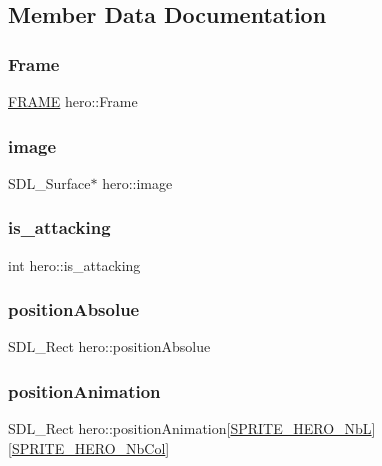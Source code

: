 \subsection{Member Data Documentation}
\mbox{\label{structhero_a5c0232e4390f7b0a64ab38f2fd0aa09b}} 
\subsubsection{\texorpdfstring{Frame}{Frame}}
{\footnotesize\ttfamily \hyperlink{structFRAME}{F\+R\+A\+ME} hero\+::\+Frame}

\mbox{\label{structhero_aed2e9c21cff3178bfb3253b278221f5d}} 
\subsubsection{\texorpdfstring{image}{image}}
{\footnotesize\ttfamily S\+D\+L\+\_\+\+Surface$\ast$ hero\+::image}

\mbox{\label{structhero_a550bb6de077fc72e5f8c79ba86ea19ac}} 
\subsubsection{\texorpdfstring{is\+\_\+attacking}{is\_attacking}}
{\footnotesize\ttfamily int hero\+::is\+\_\+attacking}

\mbox{\label{structhero_abda17b4c734008f7324f196824f0ecaf}} 
\subsubsection{\texorpdfstring{position\+Absolue}{positionAbsolue}}
{\footnotesize\ttfamily S\+D\+L\+\_\+\+Rect hero\+::position\+Absolue}

\mbox{\label{structhero_a7e9b84755093a175ee262d43911d267a}} 
\subsubsection{\texorpdfstring{position\+Animation}{positionAnimation}}
{\footnotesize\ttfamily S\+D\+L\+\_\+\+Rect hero\+::position\+Animation\mbox{[}\hyperlink{defs_8h_ae70e0edee476cfe7672e361c7883c2c3}{S\+P\+R\+I\+T\+E\+\_\+\+H\+E\+R\+O\+\_\+\+NbL}\mbox{]}\mbox{[}\hyperlink{defs_8h_acef7d9709f30d0ebb21fa325bd27a90d}{S\+P\+R\+I\+T\+E\+\_\+\+H\+E\+R\+O\+\_\+\+Nb\+Col}\mbox{]}}

